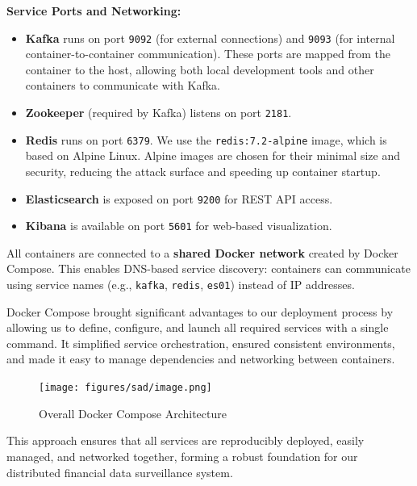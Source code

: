 \textbf{Service Ports and Networking:}
\begin{itemize}
    \item \textbf{Kafka} runs on port \texttt{9092} (for external connections) and \texttt{9093} (for internal container-to-container communication). These ports are mapped from the container to the host, allowing both local development tools and other containers to communicate with Kafka.
    \item \textbf{Zookeeper} (required by Kafka) listens on port \texttt{2181}.
    \item \textbf{Redis} runs on port \texttt{6379}. We use the \texttt{redis:7.2-alpine} image, which is based on Alpine Linux. Alpine images are chosen for their minimal size and security, reducing the attack surface and speeding up container startup.
    \item \textbf{Elasticsearch} is exposed on port \texttt{9200} for REST API access.
    \item \textbf{Kibana} is available on port \texttt{5601} for web-based visualization.
\end{itemize}

All containers are connected to a \textbf{shared Docker network} created by Docker Compose. This enables DNS-based service discovery: containers can communicate using service names (e.g., \texttt{kafka}, \texttt{redis}, \texttt{es01}) instead of IP addresses.

Docker Compose brought significant advantages to our deployment process by allowing us to define, configure, and launch all required services with a single command. It simplified service orchestration, ensured consistent environments, and made it easy to manage dependencies and networking between containers.

\begin{figure}[H]
    \centering
    \texttt{[image: figures/sad/image.png]}
    \caption{Overall Docker Compose Architecture}
    \label{fig:docker_compose_architecture}
\end{figure}


This approach ensures that all services are reproducibly deployed, easily managed, and networked together, forming a robust foundation for our distributed financial data surveillance system.


